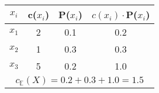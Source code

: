\qquad
 \begin{tabular}{cccc}
\multicolumn{1}{c|}{$x_i$} & c($x_i$) & P($x_i$) & $c(x_i)\cdot$P($x_i$) \\ \hline
\multicolumn{1}{c|}{$x_1$} & 2        & 0.1      & 0.2                   \\
\multicolumn{1}{c|}{$x_2$} & 1        & 0.3      & 0.3                   \\
\multicolumn{1}{c|}{$x_3$} & 5        & 0.2      & 1.0                   \\ \hline
\multicolumn{4}{c}{$c_{\mathbb{E}}(X)=0.2+0.3+1.0=1.5$}                                
\end{tabular}
